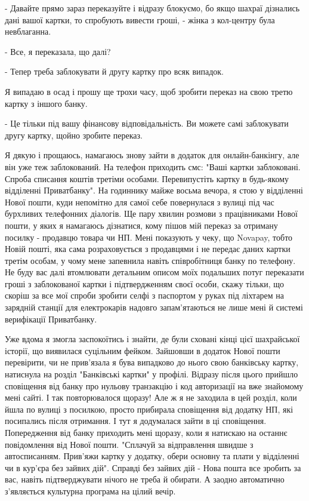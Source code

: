 - Давайте прямо зараз переказуйте і відразу блокуємо, бо якщо шахраї дізнались
дані вашої картки, то спробують вивести гроші, - жінка з кол-центру була
невблаганна.

- Все, я переказала, що далі?

- Тепер треба заблокувати й другу картку про всяк випадок.

Я випадаю в осад і прошу ще трохи часу, щоб зробити переказ на свою третю
картку з іншого банку. 

- Це тільки під вашу фінансову відповідальність. Ви можете самі заблокувати
другу картку, щойно зробите переказ. 

Я дякую і прощаюсь, намагаюсь знову зайти в додаток для онлайн-банкінгу, але
він уже теж заблокований. На телефон приходить смс: "Ваші картки заблоковані.
Спроба списання коштів третіми особами. Перевипустіть картку в будь-якому
відділенні Приватбанку". На годиннику майже восьма вечора, я стою у відділенні
Нової пошти, куди непомітно для самої себе повернулася з вулиці під час
бурхливих телефонних діалогів. Ще пару хвилин розмови з працівниками Нової
пошти, у яких я намагаюсь дізнатися, кому пішов мій переказ за отриману посилку
- продавцю товара чи НП. Мені показують у чеку, що Novapay, тобто Новій пошті,
яка сама розраховується з продавцями і не передає даних картки третім особам, у
чому мене запевнила навіть співробітниця банку по телефону. Не буду вас далі
втомлювати детальним описом моїх подальших потуг переказати гроші з
заблокованої картки і підтвердженням своєї особи, скажу тільки, що скоріш за
все мої спроби зробити селфі з паспортом у руках під ліхтарем на зарядній
станції для електрокарів надовго запам'ятаються не лише мені й системі
верифікації Приватбанку.

Уже вдома я змогла заспокоїтись і знайти, де були сховані кінці цієї
шахрайської історії, що виявилася суцільним фейком. Зайшовши в додаток Нової
пошти перевірити, чи не прив'язала я бува випадково до нього свою банківську
картку, натиснула на розділ "Банківські картки" у профілі. Відразу після цього
прийшло сповіщення від банку про нульову транзакцію і код авторизації на вже
знайомому мені сайті. І так повторювалося щоразу! Але ж я не заходила в цей
розділ, коли йшла по вулиці з посилкою, просто прибирала сповіщення від додатку
НП, які посипались після отримання. І тут я додумалася зайти в ці сповіщення.
Попередження від банку приходить мені щоразу, коли я натискаю на останнє
повідомлення від Нової пошти. "Сплачуй за відправлення швидше з автосписанням.
Прив'яжи картку у додатку, обери основну та плати у відділенні чи в кур'єра без
зайвих дій". Справді без зайвих дій - Нова пошта все зробить за вас, навіть
підтверджувати нічого не треба й обирати. А заодно автоматично з'являється
культурна програма на цілий вечір.

